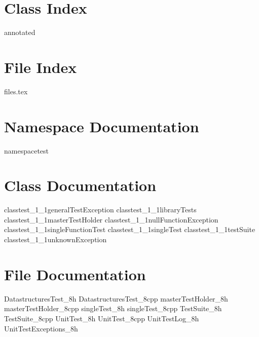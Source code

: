 \renewcommand{\DOXYGENFOLDER}{../../UnitTest/Documentation/doxygenFiles/latex/}
	
	\chapter{Class Index}
		{annotated}
	\chapter{File Index}
		{files.tex}
	\chapter{Namespace Documentation}
		{namespacetest}
	
	\chapter{Class Documentation}
		{classtest_1_1generalTestException}
		{classtest_1_1libraryTests}
		{classtest_1_1masterTestHolder}
		{classtest_1_1nullFunctionException}
		{classtest_1_1singleFunctionTest}
		{classtest_1_1singleTest}
		{classtest_1_1testSuite}
		{classtest_1_1unknownException}
	
	\chapter{File Documentation}
		{DatastructuresTest_8h}
		{DatastructuresTest_8cpp}
		{masterTestHolder_8h}
		{masterTestHolder_8cpp}
		{singleTest_8h}
		{singleTest_8cpp}
		{TestSuite_8h}
		{TestSuite_8cpp}
		{UnitTest_8h}
		{UnitTest_8cpp}
		{UnitTestLog_8h}
		{UnitTestExceptions_8h}
		